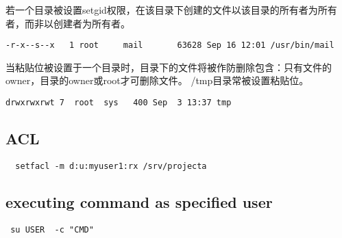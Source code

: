 若一个目录被设置setgid权限，在该目录下创建的文件以该目录的所有者为所有者，而非以创建者为所有者。
\begin{verbatim}  
-r-x--s--x   1 root     mail       63628 Sep 16 12:01 /usr/bin/mail
\end{verbatim}

  当粘贴位被设置于一个目录时，目录下的文件将被作防删除包含：只有文件的owner，目录的owner或root才可删除文件。
  /tmp目录常被设置粘贴位。
  
\begin{verbatim}  
drwxrwxrwt 7  root  sys   400 Sep  3 13:37 tmp
\end{verbatim}
  
  
 \subsection{ACL} 
 \begin{verbatim}
  setfacl -m d:u:myuser1:rx /srv/projecta
 \end{verbatim}
  
  
 \subsection{executing command as specified user} 

 \begin{verbatim}
 su USER  -c "CMD"
 \end{verbatim}
  
  
  
